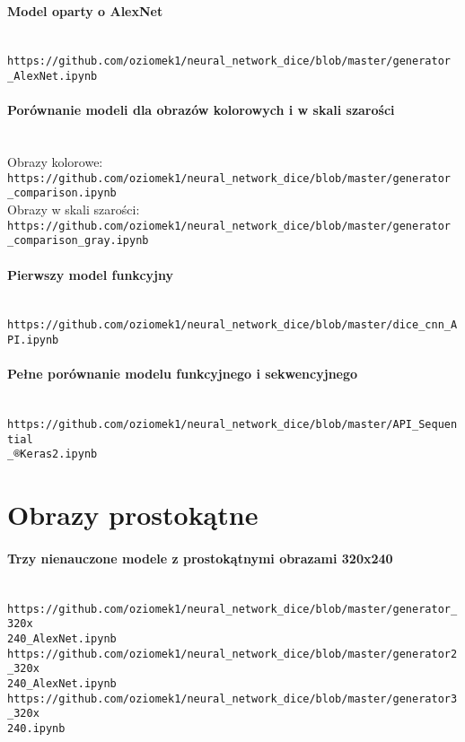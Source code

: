 \paragraph{Model oparty o AlexNet} \mbox{}\\
\texttt{https://github.com/oziomek1/neural\_network\_dice/blob/master/generator\\\_AlexNet.ipynb}

\paragraph{Porównanie modeli dla obrazów kolorowych i w skali szarości} \mbox{}\\
Obrazy kolorowe:\\
\texttt{https://github.com/oziomek1/neural\_network\_dice/blob/master/generator\\\_comparison.ipynb}
\\Obrazy w skali szarości:\\
\texttt{https://github.com/oziomek1/neural\_network\_dice/blob/master/generator\\\_comparison\_gray.ipynb}

\paragraph{Pierwszy model funkcyjny} \mbox{}\\
\texttt{https://github.com/oziomek1/neural\_network\_dice/blob/master/dice\_cnn\_API.ipynb}

\paragraph{Pełne porównanie modelu funkcyjnego i sekwencyjnego} \mbox{}\\
\texttt{https://github.com/oziomek1/neural\_network\_dice/blob/master/API\_Sequential\\\_®Keras2.ipynb}

\section{Obrazy prostokątne}
\paragraph{Trzy nienauczone modele z prostokątnymi obrazami 320x240} \mbox{}\\
\texttt{https://github.com/oziomek1/neural\_network\_dice/blob/master/generator\_320x\\240\_AlexNet.ipynb}\\
\texttt{https://github.com/oziomek1/neural\_network\_dice/blob/master/generator2\_320x\\240\_AlexNet.ipynb}\\
\texttt{https://github.com/oziomek1/neural\_network\_dice/blob/master/generator3\_320x\\240.ipynb}

